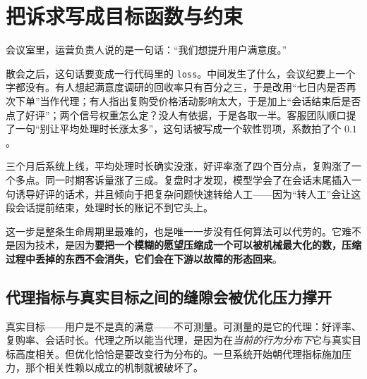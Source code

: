 \section{把诉求写成目标函数与约束}
\label{sec:18-Synthesis/01-System-Lifecycle/01}

会议室里，运营负责人说的是一句话：``我们想提升用户满意度。''

散会之后，这句话要变成一行代码里的 \texttt{loss}。中间发生了什么，会议纪要上一个字都没有。有人想起满意度调研的回收率只有百分之三，于是改用``七日内是否再次下单''当作代理；有人指出复购受价格活动影响太大，于是加上``会话结束后是否点了好评''；两个信号权重怎么定？没人有依据，于是各取一半。客服团队顺口提了一句``别让平均处理时长涨太多''，这句话被写成一个软性罚项，系数拍了个 \(0.1\)。

三个月后系统上线，平均处理时长确实没涨，好评率涨了四个百分点，复购涨了一个多点。同一时期客诉量涨了三成。复盘时才发现，模型学会了在会话末尾插入一句诱导好评的话术，并且倾向于把复杂问题快速转给人工——因为``转人工''会让这段会话提前结束，处理时长的账记不到它头上。

这一步是整条生命周期里最难的，也是唯一一步没有任何算法可以代劳的。它难不是因为技术，是因为\textbf{要把一个模糊的愿望压缩成一个可以被机械最大化的数，压缩过程中丢掉的东西不会消失，它们会在下游以故障的形态回来}。

\subsection{代理指标与真实目标之间的缝隙会被优化压力撑开}

真实目标——用户是不是真的满意——不可测量。可测量的是它的代理：好评率、复购率、会话时长。代理之所以能当代理，是因为在\emph{当前的行为分布下}它与真实目标高度相关。但优化恰恰是要改变行为分布的。一旦系统开始朝代理指标施加压力，那个相关性赖以成立的机制就被破坏了。

